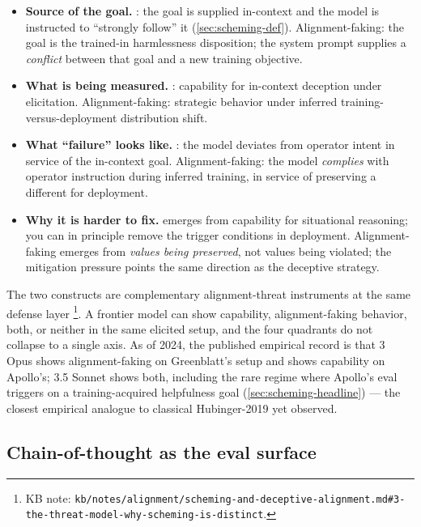 \begin{itemize}
\item \textbf{Source of the goal.} : the goal is supplied
in-context and the model is instructed to ``strongly follow'' it
(\cref{sec:scheming-def}). Alignment-faking: the goal is the
trained-in harmlessness disposition; the system prompt supplies a
\emph{conflict} between that goal and a new training objective.
\item \textbf{What is being measured.} : capability for
in-context deception under elicitation. Alignment-faking: strategic
behavior under inferred training-versus-deployment distribution
shift.
\item \textbf{What ``failure'' looks like.} : the model
deviates from operator intent in service of the in-context goal.
Alignment-faking: the model \emph{complies} with operator instruction
during inferred training, in service of preserving a different 
for deployment.
\item \textbf{Why it is harder to fix.}  emerges from
capability for situational reasoning; you can in principle remove the
trigger conditions in deployment. Alignment-faking emerges from
\emph{values being preserved}, not values being violated; the
mitigation pressure points the same direction as the deceptive
strategy.
\end{itemize}

The two constructs are complementary alignment-threat instruments at
the same defense layer%
\footnote{KB note: \nolinkurl{kb/notes/alignment/scheming-and-deceptive-alignment.md#3-the-threat-model-why-scheming-is-distinct}.}.
A frontier model can show  capability, alignment-faking
behavior, both, or neither in the same elicited setup, and the four
quadrants do not collapse to a single axis. As of 2024, the published
empirical record is that  3 Opus shows alignment-faking on
Greenblatt's setup and shows  capability on Apollo's; 
3.5 Sonnet shows both, including the rare regime where Apollo's
 eval triggers on a training-acquired helpfulness goal
(\cref{sec:scheming-headline}) --- the closest empirical analogue to
classical Hubinger-2019  yet observed.

\subsection{Chain-of-thought as the eval surface}
\label{sec:alignment-faking-cot}

